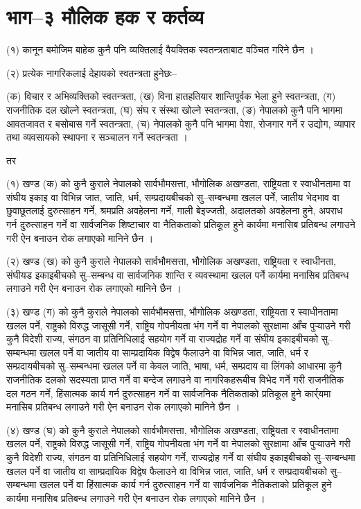 \section{भाग–३ मौलिक हक र कर्तव्य}

(१) कानून बमोजिम बाहेक कुनै पनि व्यक्तिलाई वैयक्तिक स्वतन्त्रताबाट वञ्चित गरिने छैन ।

(२) प्रत्येक नागरिकलाई देहायको स्वतन्त्रता हुनेछः–

(क) विचार र अभिव्यक्तिको स्वतन्त्रता,
(ख) विना हातहतियार शान्तिपूर्वक भेला हुने स्वतन्त्रता,
(ग) राजनीतिक दल खोल्ने स्वतन्त्रता,
(घ) संघ र संस्था खोल्ने स्वतन्त्रता,
(ङ) नेपालको कुनै पनि भागमा आवतजावत र बसोबास गर्ने स्वतन्त्रता,
(च) नेपालको कुनै पनि भागमा पेशा, रोजगार गर्ने र उद्योग, व्यापार तथा व्यवसायको स्थापना र सञ्चालन गर्ने स्वतन्त्रता ।

तर

(१) खण्ड (क) को कुनै कुराले नेपालको सार्वभौमसत्ता, भौगोलिक अखण्डता, राष्ट्रियता र स्वाधीनतामा वा संघीय इकाइ वा विभिन्न जात, जाति, धर्म, सम्प्रदायबीचको सु–सम्बन्धमा खलल पर्नेे, जातीय भेदभाव वा छुवाछूतलाई दुरुत्साहन गर्ने, श्रमप्रति अवहेलना गर्ने, गाली बेइज्जती, अदालतको अवहेलना हुने, अपराध गर्न दुरुत्साहन गर्ने वा सार्वजनिक शिष्टाचार वा नैतिकताको प्रतिकूल हुने कार्यमा मनासिब प्रतिबन्ध लगाउने गरी ऐन बनाउन रोक लगाएको मानिने छैन ।

(२) खण्ड (ख) को कुनै कुराले नेपालको सार्वभौमसत्ता, भौगोलिक अखण्डता, राष्ट्रियता र स्वाधीनता, संघीयड इकाइबीचको सु–सम्बन्ध वा सार्वजनिक शान्ति र व्यवस्थामा खलल पर्ने कार्यमा मनासिब प्रतिबन्ध लगाउने गरी ऐन बनाउन रोक लगाएको मानिने छैन ।

(३) खण्ड (ग) को कुनै कुराले नेपालको सार्वभौमसत्ता, भौगोलिक अखण्डता, राष्ट्रियता र स्वाधीनतामा खलल पर्ने, राष्ट्रको विरुद्ध जासूसी गर्ने, राष्ट्रिय गोपनीयता भंग गर्ने वा नेपालको सुरक्षामा आँच पुर्‍याउने गरी कुनै विदेशी राज्य, संगठन वा प्रतिनिधिलाई सहयोग गर्ने वा राज्यद्रोह गर्ने वा संघीय इकाइबीचको सु–सम्बन्धमा खलल पर्ने वा जातीय वा साम्प्रदायिक विद्वेष फैलाउने वा विभिन्न जात, जाति, धर्म र सम्प्रदायबीचको सु–सम्बन्धमा खलल पर्ने वा केवल जाति, भाषा, धर्म, सम्प्रदाय वा लिंगको आधारमा कुनै राजनीतिक दलको सदस्यता प्राप्त गर्ने वा बन्देज लगाउने वा नागरिकहरूबीच विभेद गर्ने गरी राजनीतिक दल गठन गर्ने, हिंसात्मक कार्य गर्न दुरुत्साहन गर्ने वा सार्वजनिक नैतिकताको प्रतिकूल हुने कार्र्यमा मनासिब प्रतिबन्ध लगाउने गरी ऐन बनाउन रोक लगाएको मानिने छैन ।

(४) खण्ड (घ) को कुनै कुराले नेपालको सार्वभौमसत्ता, भौगोलिक अखण्डता, राष्ट्रियता र स्वाधीनतामा खलल पर्ने, राष्ट्रको विरुद्ध जासूसी गर्ने, राष्ट्रिय गोपनीयता भंग गर्ने वा नेपालको सुरक्षामा आँच पुर्‍याउने गरी कुनै विदेशी राज्य, संगठन वा प्रतिनिधिलाई सहयोग गर्ने, राज्यद्रोह गर्ने वा संघीय इकाइबीचको सु–सम्बन्धमा खलल पर्ने वा जातीय वा साम्प्रदायिक विद्वेष फैलाउने वा विभिन्न जात, जाति, धर्म र सम्प्रदायबीचको सु–सम्बन्धमा खलल पर्ने वा हिंसात्मक कार्य गर्न दुरुत्साहन गर्ने वा सार्वजनिक नैतिकताको प्रतिकूल हुने कार्यमा मनासिब प्रतिबन्ध लगाउने गरी ऐन बनाउन रोक लगाएको मानिने छैन ।

